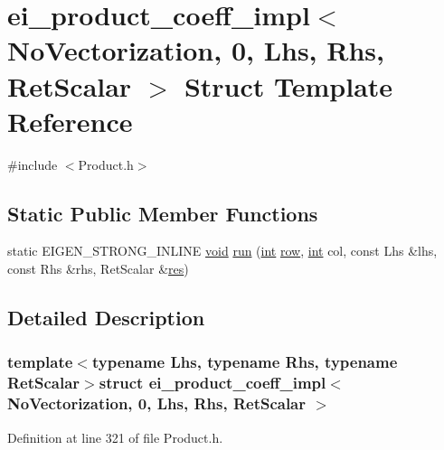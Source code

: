 \hypertarget{structei__product__coeff__impl_3_01_no_vectorization_00_010_00_01_lhs_00_01_rhs_00_01_ret_scalar_01_4}{\section{ei\-\_\-product\-\_\-coeff\-\_\-impl$<$ No\-Vectorization, 0, Lhs, Rhs, Ret\-Scalar $>$ Struct Template Reference}
\label{structei__product__coeff__impl_3_01_no_vectorization_00_010_00_01_lhs_00_01_rhs_00_01_ret_scalar_01_4}
}


{\ttfamily \#include $<$Product.\-h$>$}

\subsection*{Static Public Member Functions}
\begin{DoxyCompactItemize}
\item 
static E\-I\-G\-E\-N\-\_\-\-S\-T\-R\-O\-N\-G\-\_\-\-I\-N\-L\-I\-N\-E \hyperlink{group___u_a_v_objects_plugin_ga444cf2ff3f0ecbe028adce838d373f5c}{void} \hyperlink{structei__product__coeff__impl_3_01_no_vectorization_00_010_00_01_lhs_00_01_rhs_00_01_ret_scalar_01_4_a70c3d8dbfe78813c87d3099b181e6066}{run} (\hyperlink{ioapi_8h_a787fa3cf048117ba7123753c1e74fcd6}{int} \hyperlink{glext_8h_a11b277b422822f784ee248b43eee3e1e}{row}, \hyperlink{ioapi_8h_a787fa3cf048117ba7123753c1e74fcd6}{int} col, const Lhs \&lhs, const Rhs \&rhs, Ret\-Scalar \&\hyperlink{glext_8h_a1dbb21208b9047cc8031ca9c840d3c2f}{res})
\end{DoxyCompactItemize}


\subsection{Detailed Description}
\subsubsection*{template$<$typename Lhs, typename Rhs, typename Ret\-Scalar$>$struct ei\-\_\-product\-\_\-coeff\-\_\-impl$<$ No\-Vectorization, 0, Lhs, Rhs, Ret\-Scalar $>$}



Definition at line 321 of file Product.\-h.



